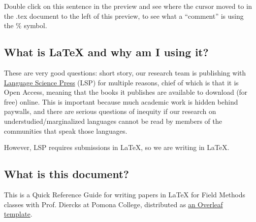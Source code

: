 \documentclass[output=paper,colorlinks,citecolor=brown]{langscibook}
\begin{document}
Double click on this sentence in the preview and see where the cursor moved to in the .tex document to the left of this preview, to see what a ``comment'' is using the \% symbol. 



\subsection{What is \LaTeX{} and why am I using it?}

These are very good questions: short story, our research team is publishing with \href{https://langsci-press.org}{Language Science Press} (LSP) for multiple reasons, chief of which is that it is Open Access, meaning that the books it publishes are available to download (for free) online. This is important because much academic work is hidden behind paywalls, and there are serious questions of inequity if our research on understudied/marginalized languages cannot be read by members of the communities that speak those languages. 

However, LSP requires submissions in \LaTeX{}, so we are writing in \LaTeX{}.

\subsection{What is this document?}

This is a Quick Reference Guide for writing papers in \LaTeX{} for Field Methods classes with Prof. Diercks at Pomona College, distributed as \href{https://www.overleaf.com/latex/templates/field-methods-papers-quick-reference-guide/cqbjxwnffvrm}{an Overleaf template}.
\end{document}
